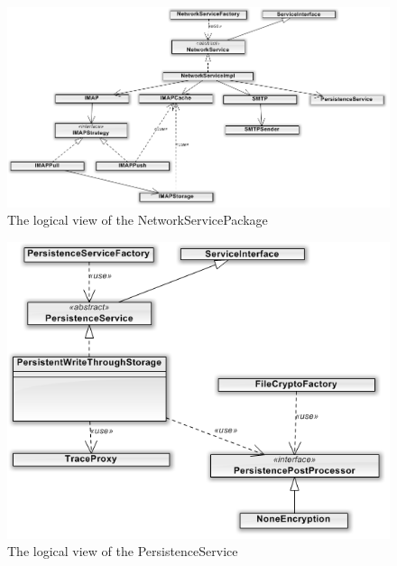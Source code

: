 \begin{figure}[H]
	\includegraphics[width=\textwidth]{NetworkService.png}
	\caption{The logical view of the NetworkServicePackage}
	\label{fig:logicalnetworkpackview}
\end{figure}
\begin{figure}[H]
	\includegraphics[width=\textwidth]{persistenceService.png}
	\caption{The logical view of the PersistenceService}
	\label{fig:logicalpersistencepackview}
\end{figure}
